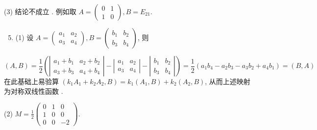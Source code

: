 \documentclass[10pt]{article}
\begin{document}
(3)  结论不成立 .  例如取  $A=\left(\begin{array}{ll}0 & 1 \\ 1 & 0\end{array}\right), B=E_{21}$.

\begin{enumerate}
  \setcounter{enumi}{4}
  \item (1)  设  $A=\left(\begin{array}{ll}a_{1} & a_{2} \\ a_{3} & a_{4}\end{array}\right), B=\left(\begin{array}{ll}b_{1} & b_{2} \\ b_{3} & b_{4}\end{array}\right)$,  则 
\end{enumerate}
$$
(A, B)=\frac{1}{2}\left(\left|\begin{array}{ll}
a_{1}+b_{1} & a_{2}+b_{2} \\
a_{3}+b_{3} & a_{4}+b_{4}
\end{array}\right|-\left|\begin{array}{ll}
a_{1} & a_{2} \\
a_{3} & a_{4}
\end{array}\right|-\left|\begin{array}{cc}
b_{1} & b_{2} \\
b_{3} & b_{4}
\end{array}\right|\right)=\frac{1}{2}\left(a_{1} b_{4}-a_{2} b_{3}-a_{3} b_{2}+a_{4} b_{1}\right)=(B, A)
$$
 在此基础上易验算  $\left(k_{1} A_{1}+k_{2} A_{2}, B\right)=k_{1}\left(A_{1}, B\right)+k_{2}\left(A_{2}, B\right)$, 从而上述映射为对称双线性函数 .

(2) $M=\frac{1}{2}\left(\begin{array}{ccc}0 & 1 & 0 \\ 1 & 0 & 0 \\ 0 & 0 & -2\end{array}\right)$.
\end{document}
